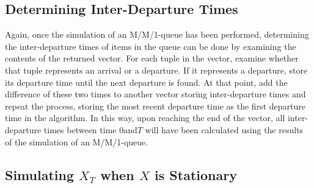 \documentclass[11pt, oneside]{article}
\begin{document}
\subsection{Determining Inter-Departure Times}
Again, once the simulation of an M/M/1-queue has been performed, determining the inter-departure times of items in the queue can be done by examining the contents of the returned vector. For each tuple in the vector, examine whether that tuple represents an arrival or a departure. If it represents a departure, store its departure time until the next departure is found. At that point, add the difference of these two times to another vector storing inter-departure times and repeat the process, storing the most recent departure time as the first departure time in the algorithm. In this way, upon reaching the end of the vector, all inter-departure times between time $0 \text{and} T$ will have been calculated using the results of the simulation of an M/M/1-queue.

\subsection{Simulating $X_T$ when $X$ is Stationary}
\subsection{}
\subsection{}
\end{document}
